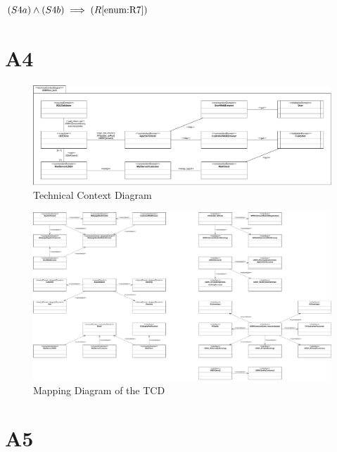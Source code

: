\documentclass[a4paper,10pt,titlepage,bibtotoc,bibtotocnumbered]{scrreprt}
\begin{document}
$(S4a) \land (S4b) \implies (R\ref{enum:R7})$

\newpage\section{A4}

\begin{figure}[H]
    \centering
    \includegraphics[width = \textwidth]{figures/06/a06_technical_context_diagram-TCD.pdf}
    \caption{Technical Context Diagram}
    \label{figure:tcd}
\end{figure}

\begin{figure}[H]
    \centering
    \includegraphics[width = \textwidth]{figures/06/a06_technical_context_diagram-Mapping.pdf}
    \caption{Mapping Diagram of the TCD}
    \label{figure:tcd_md}
\end{figure}

\newpage\section{A5}
\lstset{language=OCL}          %
\end{document}
